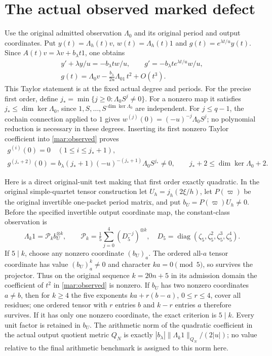 \documentclass[11pt]{article}
\newcommand{\diag}{\operatorname{diag}}
\begin{document}
\section{The actual observed marked defect}
Use the original admitted observation $\Lambda_0$ and its original
period and output coordinates. Put
$y(t)=\Lambda_h(t)v$, $w(t)=\Lambda_h(t)1$ and
$g(t)=e^{\lambda t/u}y(t)$. Since
$A(t)v=\lambda v+b_\lambda t1$, one obtains
\begin{equation}\tag{MAR20}\label{mar:observed}
 \begin{gathered}
 y'+\lambda y/u=-b_\lambda t w/u,\qquad
 g'=-b_\lambda t e^{\lambda t/u}w/u,\\
 g(t)=\Lambda_0v-\frac{b_\lambda}{2u}\Lambda_01\,t^2+O(t^3).
 \end{gathered}
\end{equation}
This Taylor statement is at the fixed actual degree and periods.
For the precise first order, define
$j_* =\min\{j\ge0:\Lambda_0 S^j\ne0\}$.
For a nonzero map it satisfies $j_*\le\dim\ker\Lambda_0$,
since $1,S,\ldots,S^{\dim\ker\Lambda_0}$ are independent.
For $j\le q-1$, the cochain connection applied to $1$ gives
$w^{(j)}(0)=(-u)^{-j}\Lambda_0S^j$; no polynomial reduction
is necessary in these degrees. Inserting its first nonzero
Taylor coefficient into \eqref{mar:observed} proves
\begin{equation}\tag{MAR21}\label{mar:firstdefect}
 \begin{gathered}
 g^{(i)}(0)=0\quad(1\le i\le j_*+1),\\
 g^{(j_*+2)}(0)
   =b_\lambda(j_*+1)(-u)^{-(j_*+1)}\Lambda_0S^{j_*}\ne0,
 \qquad j_*+2\le\dim\ker\Lambda_0+2.
 \end{gathered}
\end{equation}

Here is a direct original-unit test making that first order
exactly quadratic. In the original simple-quartet tensor
construction let $U_h=j_h(2\xi/h)$, let $P(\varpi)$ be the
original invertible one-packet period matrix, and put
$b_U=P(\varpi)U_h\ne0$. Before the specified invertible output
coordinate map, the constant-class observation is
\begin{equation}\tag{MAR22}\label{mar:constant-survival}
 \Lambda_k1=\mathcal P_k b_U^{\otimes k},\qquad
 \mathcal P_k=\tfrac15\sum_{j=0}^4(D_5^{-j})^{\otimes k},
 \quad D_5=\diag(\zeta_5,\zeta_5^2,\zeta_5^3,\zeta_5^4).
\end{equation}
If $5\mid k$, choose any nonzero coordinate $(b_U)_a$.
The ordered all-$a$ tensor coordinate has value $(b_U)_a^k\ne0$
and character $ka=0\pmod5$, so survives the projector. Thus on
the original sequence $k=20n+5$ in its admission domain the
coefficient of $t^2$ in \eqref{mar:observed} is nonzero.
If $b_U$ has two nonzero coordinates $a\ne b$, then for $k\ge4$
the five exponents $ka+r(b-a)$, $0\le r\le4$, cover all residues;
one ordered tensor with $r$ entries $b$ and $k-r$ entries $a$
therefore survives. If it has only one nonzero coordinate, the
exact criterion is $5\mid k$. Every unit factor is retained in
$b_U$. The arithmetic norm of the quadratic coefficient in the
actual output quotient metric $Q_N$ is exactly
$|b_\lambda|\|\Lambda_k1\|_{Q_N}/(2|u|)$; no value relative to
the final arithmetic benchmark is assigned to this norm here.
\end{document}

